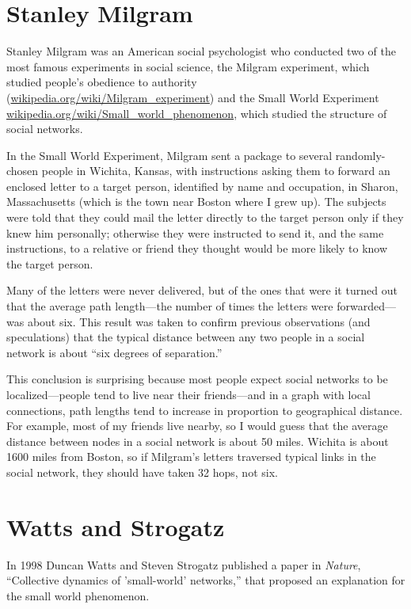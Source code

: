 \documentclass[10pt]{book}
\begin{document}
\section{Stanley Milgram}

Stanley Milgram was an American social psychologist who conducted
two of the most famous experiments in social science, the
Milgram experiment, which studied people's obedience to authority
(\url{wikipedia.org/wiki/Milgram_experiment})
and the Small World Experiment
\url{wikipedia.org/wiki/Small_world_phenomenon}, which studied
the structure of social networks.

In the Small World Experiment, Milgram sent a package to several
randomly-chosen people in Wichita, Kansas, with instructions asking
them to forward an enclosed letter to a target person, identified by
name and occupation, in Sharon, Massachusetts (which is the town near
Boston where I grew up).  The subjects were told that they could mail
the letter directly to the target person only if they knew him
personally; otherwise they were instructed to send it, and the same
instructions, to a relative or friend they thought would be more
likely to know the target person.

Many of the letters were never delivered, but of the ones that
were it turned out that the average path length---the number of
times the letters were forwarded---was about six.  This result
was taken to confirm previous observations (and speculations) that
the typical distance between any two people in a social network
is about ``six degrees of separation.''

This conclusion is surprising because most people expect social
networks to be localized---people tend to live near their
friends---and in a graph with local connections, path lengths tend to
increase in proportion to geographical distance.  For example, most of
my friends live nearby, so I would guess that the average distance
between nodes in a social network is about 50 miles.  Wichita is about
1600 miles from Boston, so if Milgram's letters traversed typical
links in the social network, they should have taken 32 hops, not six.


\section{Watts and Strogatz}

In 1998 Duncan Watts and Steven Strogatz published a paper
in {\em Nature}, ``Collective dynamics of 'small-world' networks,''
that proposed an explanation for the small world phenomenon.
\end{document}

